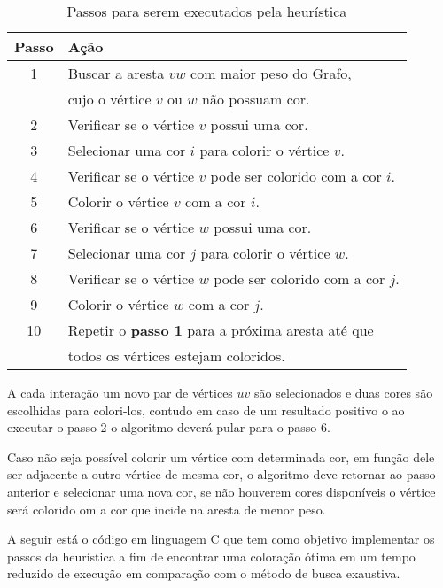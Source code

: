 \begin{table}[H]
    \centering
    \vspace{0.5cm}
    \renewcommand\arraystretch{1.5}
    \begin{tabular}{c|l}
     
        \textbf{Passo} & \textbf{Ação} \\ %
        \hline                               %
        	1 & Buscar a aresta $vw$ com maior peso do Grafo, \\ & cujo o vértice $v$ ou $w$ não possuam cor. \\
            2  & Verificar se o vértice $v$ possui uma cor. \\
            3  & Selecionar uma cor $i$ para colorir o vértice $v$. \\
            4  & Verificar se o vértice $v$ pode ser colorido com a cor $i$. \\
            5  & Colorir o vértice $v$ com a cor $i$. \\
			6  & Verificar se o vértice $w$ possui uma cor. \\
            7  & Selecionar uma cor $j$ para colorir o vértice $w$. \\
            8  & Verificar se o vértice $w$ pode ser colorido com a cor $j$. \\
            9  & Colorir o vértice $w$ com a cor $j$. \\
            10 & Repetir o \textbf{passo 1} para a próxima aresta até que \\ & todos os vértices estejam coloridos.
        \\
        \hline
    \end{tabular}
    \caption{Passos para serem executados pela heurística}
    \label{tabela-heuristica}
\end{table}

A cada interação um novo par de vértices $uv$ são selecionados e duas cores são escolhidas para colori-los, contudo em caso de um resultado positivo o ao executar o passo 2 o algoritmo deverá pular para o passo 6. 

Caso não seja possível colorir um vértice com determinada cor, em função dele ser adjacente a outro vértice de mesma cor, o algoritmo deve retornar ao passo anterior e selecionar uma nova cor, se não houverem cores disponíveis o vértice será colorido om a cor que incide na aresta de menor peso.

A seguir está o código em linguagem C que tem como objetivo implementar os passos da heurística a fim de encontrar uma coloração ótima em um tempo reduzido de execução em comparação com o método de busca exaustiva.

